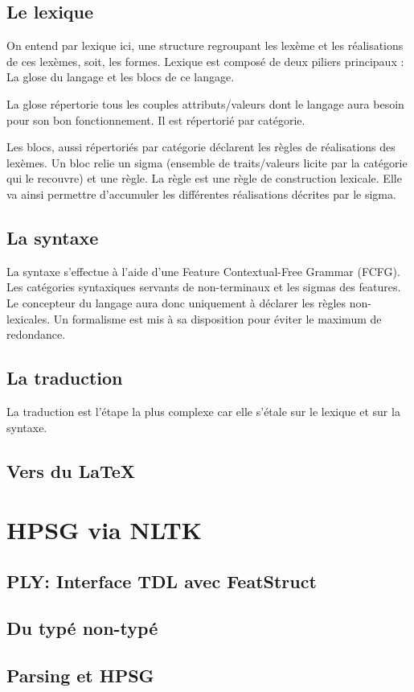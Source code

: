 \documentclass[12pt,a4paper,twoside]{article}
\begin{document}
\subsection{Le lexique}
On entend par lexique ici, une structure regroupant les lexème et les réalisations de ces lexèmes, soit, les formes.
Lexique est composé de deux piliers principaux : La glose du langage et les blocs de ce langage.

La glose répertorie tous les couples attributs/valeurs dont le langage aura besoin pour son bon fonctionnement.
Il est répertorié par catégorie.

Les blocs, aussi répertoriés par catégorie déclarent les règles de réalisations des lexèmes.
Un bloc relie un sigma (ensemble de traits/valeurs licite par la catégorie qui le recouvre) et une règle.
La règle est une règle de construction lexicale. Elle va ainsi permettre d'accumuler les différentes réalisations
décrites par le sigma.

\subsection{La syntaxe}
La syntaxe s'effectue à l'aide d'une Feature Contextual-Free Grammar (FCFG). Les catégories syntaxiques servants
de non-terminaux et les sigmas des features.
Le concepteur du langage aura donc uniquement à déclarer les règles non-lexicales. Un formalisme est mis
à sa disposition pour éviter le maximum de redondance.
\subsection{La traduction}
La traduction est l'étape la plus complexe car elle s'étale sur le lexique et sur la syntaxe.
\subsection{Vers du \LaTeX}


\section{HPSG via NLTK}
\subsection{PLY: Interface TDL avec FeatStruct}
\subsection{Du typé non-typé}
\subsection{Parsing et HPSG}
\end{document}

